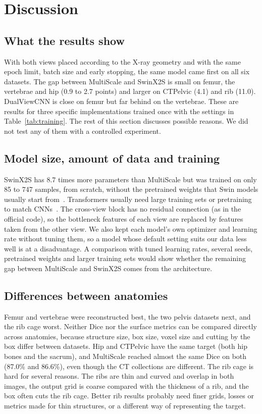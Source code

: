 \documentclass[11pt]{article}
\begin{document}
\section{Discussion}\label{sec:discussion}

\subsection{What the results show}
With both views placed according to the X-ray geometry and with the same epoch limit, batch size and early stopping, the same model came first on all six datasets. The gap between MultiScale and SwinX2S is small on femur, the vertebrae and hip (0.9 to 2.7 points) and larger on CTPelvic (4.1) and rib (11.0). DualViewCNN is close on femur but far behind on the vertebrae. These are results for three specific implementations trained once with the settings in Table~\ref{tab:training}. The rest of this section discusses possible reasons. We did not test any of them with a controlled experiment.

\subsection{Model size, amount of data and training}
SwinX2S has 8.7 times more parameters than MultiScale but was trained on only 85 to 747 samples, from scratch, without the pretrained weights that Swin models usually start from~\cite{swin2021}. Transformers usually need large training sets or pretraining to match CNNs~\cite{dosovitskiy2021}. The cross-view block has no residual connection (as in the official code), so the bottleneck features of each view are replaced by features taken from the other view. We also kept each model's own optimizer and learning rate without tuning them, so a model whose default setting suits our data less well is at a disadvantage. A comparison with tuned learning rates, several seeds, pretrained weights and larger training sets would show whether the remaining gap between MultiScale and SwinX2S comes from the architecture.

\subsection{Differences between anatomies}
Femur and vertebrae were reconstructed best, the two pelvis datasets next, and the rib cage worst. Neither Dice nor the surface metrics can be compared directly across anatomies, because structure size, box size, voxel size and cutting by the box differ between datasets. Hip and CTPelvic have the same target (both hip bones and the sacrum), and MultiScale reached almost the same Dice on both (87.0\% and 86.6\%), even though the CT collections are different. The rib cage is hard for several reasons. The ribs are thin and curved and overlap in both images, the output grid is coarse compared with the thickness of a rib, and the box often cuts the rib cage. Better rib results probably need finer grids, losses or metrics made for thin structures, or a different way of representing the target.
\end{document}
